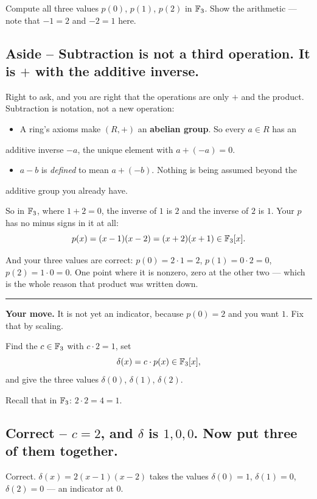 \documentclass[11pt]{article}
\begin{document}
Compute all three values $p(0)$, $p(1)$, $p(2)$ in $\mathbb{F}_{3}$. Show the arithmetic
--- note that $-1 = 2$ and $-2 = 1$ here.


\subsection*{Aside -- Subtraction is not a third operation. It is $+$ with the additive inverse.}
Right to ask, and you are right that the operations are only $+$ and the
product. Subtraction is notation, not a new operation:

\begin{itemize}
  \item A ring's axioms make $(R, +)$ an \textbf{abelian group}. So every $a \in R$ has an
\end{itemize}
  additive inverse $-a$, the unique element with $a + (-a) = 0$.
\begin{itemize}
  \item $a - b$ is \emph{defined} to mean $a + (-b)$. Nothing is being assumed beyond the
\end{itemize}
  additive group you already have.

So in $\mathbb{F}_{3}$, where $1 + 2 = 0$, the inverse of $1$ is $2$ and the inverse of
$2$ is $1$. Your $p$ has no minus signs in it at all:
$$p(x) = (x-1)(x-2) = (x+2)(x+1) \in \mathbb{F}_{3}[x].$$

And your three values are correct: $p(0) = 2\cdot 1 = 2$, $p(1) = 0 \cdot 2 = 0$,
$p(2) = 1 \cdot 0 = 0$. One point where it is nonzero, zero at the other two ---
which is the whole reason that product was written down.

\medskip\hrule\medskip

\textbf{Your move.} It is not yet an indicator, because $p(0) = 2$ and you want $1$.
Fix that by scaling.

Find the $c \in \mathbb{F}_{3}$ with $c \cdot 2 = 1$, set
$$\delta(x) = c \cdot p(x) \in \mathbb{F}_{3}[x],$$
and give the three values $\delta(0)$, $\delta(1)$, $\delta(2)$.

Recall that in $\mathbb{F}_{3}$: $2 \cdot 2 = 4 = 1$.


\subsection*{Correct -- $c = 2$, and $\delta$ is $1,0,0$. Now put three of them together.}
Correct. $\delta(x) = 2(x-1)(x-2)$ takes the values $\delta(0) = 1$,
$\delta(1) = 0$, $\delta(2) = 0$ --- an indicator at $0$.
\end{document}
